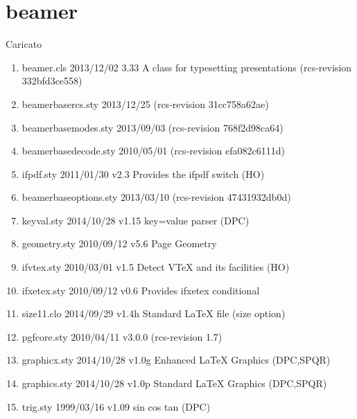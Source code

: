 \section{beamer}

Caricato 
\begin{enumerate}
\item beamer.cls 2013/12/02 3.33 A class for typesetting presentations (rcs-revision 332bfd3ce558)
\item beamerbasercs.sty 2013/12/25 (rcs-revision 31cc758a62ae)
\item beamerbasemodes.sty 2013/09/03 (rcs-revision 768f2d98ca64)
\item beamerbasedecode.sty 2010/05/01 (rcs-revision efa082c6111d)
\item ifpdf.sty 2011/01/30 v2.3 Provides the ifpdf switch (HO)
\item beamerbaseoptions.sty 2013/03/10 (rcs-revision 47431932db0d)
\item keyval.sty 2014/10/28 v1.15 key=value parser (DPC)
\item geometry.sty 2010/09/12 v5.6 Page Geometry
\item ifvtex.sty 2010/03/01 v1.5 Detect VTeX and its facilities (HO)
\item ifxetex.sty 2010/09/12 v0.6 Provides ifxetex conditional
\item size11.clo 2014/09/29 v1.4h Standard LaTeX file (size option)
\item pgfcore.sty 2010/04/11 v3.0.0 (rcs-revision 1.7)
\item graphicx.sty 2014/10/28 v1.0g Enhanced LaTeX Graphics (DPC,SPQR)
\item graphics.sty 2014/10/28 v1.0p Standard LaTeX Graphics (DPC,SPQR)
\item trig.sty 1999/03/16 v1.09 sin cos tan (DPC)

\end{enumerate}
